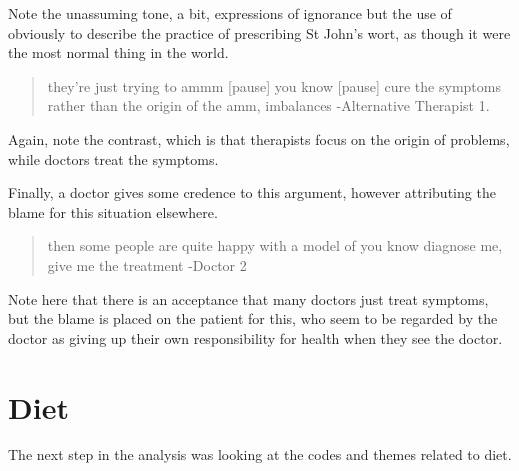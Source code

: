 Note the unassuming tone, a bit, expressions of ignorance but the use of obviously to describe the practice of prescribing St John's wort, as though it were the most normal thing in the world. 





\begin{quotation}
  they're just trying to ammm [pause] you know [pause] cure the symptoms rather than the origin of the amm, imbalances
-Alternative Therapist 1. 
\end{quotation}

Again, note the contrast, which is that therapists focus on the origin of problems, while doctors treat the symptoms. 

Finally, a doctor gives some credence to this argument, however attributing the blame for this situation elsewhere. 

\begin{quotation}
  then some people are quite happy with a model of you know diagnose me, give me the treatment
-Doctor 2
\end{quotation}

Note here that there is an acceptance that many doctors just treat symptoms, but the blame is placed on the patient for this, who seem to be regarded by the doctor as giving up their own responsibility for health when they see the doctor. 

\section{Diet}
\label{sec:diet}

The next step in the analysis was looking at the codes and themes related to diet. 

